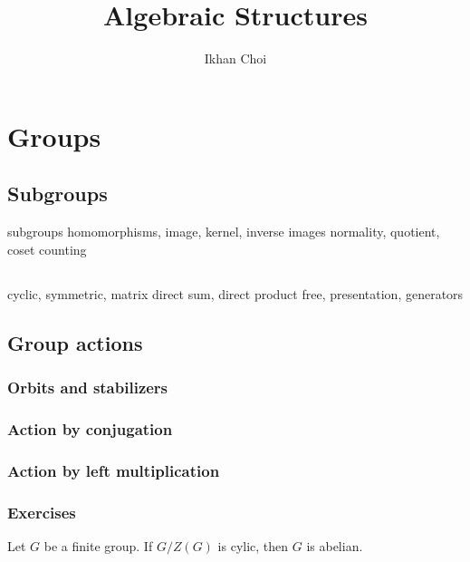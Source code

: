 \documentclass{../note}
\begin{document}
\title{Algebraic Structures}
\author{Ikhan Choi}
\maketitle
\tableofcontents

\part{Groups}
\chapter{Subgroups}
subgroups
homomorphisms, image, kernel, inverse images
normality, quotient, coset counting

\chapter{}
cyclic, symmetric, matrix
direct sum, direct product
free, presentation, generators
\section{}
\section{}

\chapter{Group actions}
\section{Orbits and stabilizers}
\section{Action by conjugation}
\section{Action by left multiplication}


\section*{Exercises}

\begin{prb}
Let $G$ be a finite group.
If $G/Z(G)$ is cylic, then $G$ is abelian.
\end{prb}
\end{document}
